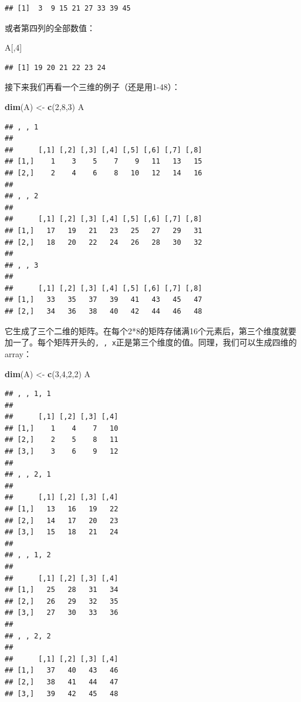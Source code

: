 \documentclass[]{book}
\newenvironment{Shaded}{\begin{snugshade}}{\end{snugshade}}
\newcommand{\DecValTok}[1]{\textcolor[rgb]{0.00,0.00,0.81}{#1}}
\newcommand{\KeywordTok}[1]{\textcolor[rgb]{0.13,0.29,0.53}{\textbf{#1}}}
\newcommand{\NormalTok}[1]{#1}
\newcommand{\StringTok}[1]{\textcolor[rgb]{0.31,0.60,0.02}{#1}}
\begin{document}
\begin{verbatim}
## [1]  3  9 15 21 27 33 39 45
\end{verbatim}

或者第四列的全部数值：

\begin{Shaded}
\begin{Highlighting}[]
\NormalTok{A[,}\DecValTok{4}\NormalTok{]}
\end{Highlighting}
\end{Shaded}

\begin{verbatim}
## [1] 19 20 21 22 23 24
\end{verbatim}

接下来我们再看一个三维的例子（还是用1-48）：

\begin{Shaded}
\begin{Highlighting}[]
\KeywordTok{dim}\NormalTok{(A) <-}\StringTok{ }\KeywordTok{c}\NormalTok{(}\DecValTok{2}\NormalTok{,}\DecValTok{8}\NormalTok{,}\DecValTok{3}\NormalTok{)}
\NormalTok{A}
\end{Highlighting}
\end{Shaded}

\begin{verbatim}
## , , 1
## 
##      [,1] [,2] [,3] [,4] [,5] [,6] [,7] [,8]
## [1,]    1    3    5    7    9   11   13   15
## [2,]    2    4    6    8   10   12   14   16
## 
## , , 2
## 
##      [,1] [,2] [,3] [,4] [,5] [,6] [,7] [,8]
## [1,]   17   19   21   23   25   27   29   31
## [2,]   18   20   22   24   26   28   30   32
## 
## , , 3
## 
##      [,1] [,2] [,3] [,4] [,5] [,6] [,7] [,8]
## [1,]   33   35   37   39   41   43   45   47
## [2,]   34   36   38   40   42   44   46   48
\end{verbatim}

它生成了三个二维的矩阵。在每个2*8的矩阵存储满16个元素后，第三个维度就要加一了。每个矩阵开头的\texttt{,\ ,\ x}正是第三个维度的值。同理，我们可以生成四维的array：

\begin{Shaded}
\begin{Highlighting}[]
\KeywordTok{dim}\NormalTok{(A) <-}\StringTok{ }\KeywordTok{c}\NormalTok{(}\DecValTok{3}\NormalTok{,}\DecValTok{4}\NormalTok{,}\DecValTok{2}\NormalTok{,}\DecValTok{2}\NormalTok{)}
\NormalTok{A}
\end{Highlighting}
\end{Shaded}

\begin{verbatim}
## , , 1, 1
## 
##      [,1] [,2] [,3] [,4]
## [1,]    1    4    7   10
## [2,]    2    5    8   11
## [3,]    3    6    9   12
## 
## , , 2, 1
## 
##      [,1] [,2] [,3] [,4]
## [1,]   13   16   19   22
## [2,]   14   17   20   23
## [3,]   15   18   21   24
## 
## , , 1, 2
## 
##      [,1] [,2] [,3] [,4]
## [1,]   25   28   31   34
## [2,]   26   29   32   35
## [3,]   27   30   33   36
## 
## , , 2, 2
## 
##      [,1] [,2] [,3] [,4]
## [1,]   37   40   43   46
## [2,]   38   41   44   47
## [3,]   39   42   45   48
\end{verbatim}
\end{document}
